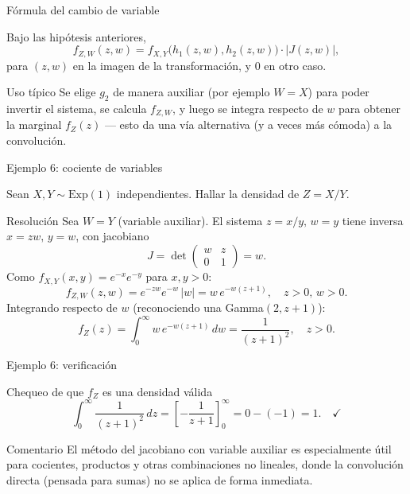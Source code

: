 \documentclass[aspectratio=169,11pt]{beamer}
\begin{document}
\begin{frame}{Fórmula del cambio de variable}
\begin{theorem}
Bajo las hipótesis anteriores,
\[
f_{Z,W}(z,w) = f_{X,Y}\big(h_1(z,w), h_2(z,w)\big) \cdot |J(z,w)|,
\]
para $(z,w)$ en la imagen de la transformación, y $0$ en otro caso.
\end{theorem}
\begin{block}{Uso típico}
Se elige $g_2$ de manera auxiliar (por ejemplo $W=X$) para poder invertir el sistema, se calcula $f_{Z,W}$, y luego se integra respecto de $w$ para obtener la marginal $f_Z(z)$ — esto da una vía alternativa (y a veces más cómoda) a la convolución.
\end{block}
\end{frame}

\begin{frame}{Ejemplo 6: cociente de variables}
\begin{example}
Sean $X,Y\sim\text{Exp}(1)$ independientes. Hallar la densidad de $Z = X/Y$.
\end{example}
\pause
\begin{block}{Resolución}
Sea $W=Y$ (variable auxiliar). El sistema $z=x/y,\, w=y$ tiene inversa $x=zw,\, y=w$, con jacobiano
\[
J = \det\begin{pmatrix} w & z \\ 0 & 1\end{pmatrix} = w.
\]
Como $f_{X,Y}(x,y) = e^{-x}e^{-y}$ para $x,y>0$:
\[
f_{Z,W}(z,w) = e^{-zw}e^{-w}\, |w| = w\, e^{-w(z+1)}, \quad z>0,\, w>0.
\]
Integrando respecto de $w$ (reconociendo una Gamma$(2,z+1)$):
\[
f_Z(z) = \int_0^\infty w\, e^{-w(z+1)}\, dw = \frac{1}{(z+1)^2}, \quad z>0.
\]
\end{block}
\end{frame}

\begin{frame}{Ejemplo 6: verificación}
\begin{block}{Chequeo de que $f_Z$ es una densidad válida}
\[
\int_0^\infty \frac{1}{(z+1)^2}\, dz = \left[-\frac{1}{z+1}\right]_0^\infty = 0-(-1) = 1. \quad \checkmark
\]
\end{block}
\begin{alertblock}{Comentario}
El método del jacobiano con variable auxiliar es especialmente útil para cocientes, productos y otras combinaciones no lineales, donde la convolución directa (pensada para sumas) no se aplica de forma inmediata.
\end{alertblock}
\end{frame}
\end{document}
